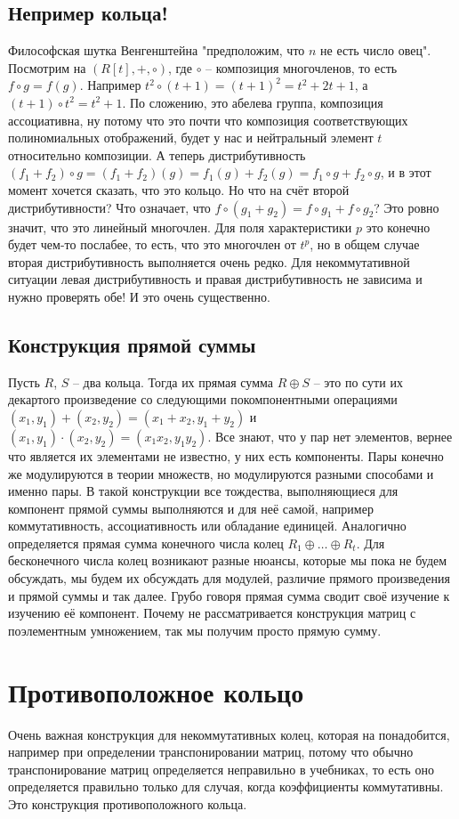 \subsection{Непример кольца!}
Философская шутка Венгенштейна "предположим, что $n$
не есть число овец". Посмотрим на $(R[t], +, \circ)$, где $\circ$ –
композиция многочленов, то есть $f\circ g = f(g)$. Например $t^2\circ
(t+1)=(t+1)^2=t^2+2t+1$, а $(t+1)\circ t^2=t^2+1$. По сложению, это
абелева группа, композиция ассоциативна, ну потому что это почти что
композиция соответствующих полиномиальных отображений, будет у нас и
нейтральный элемент $t$ относительно композиции. А теперь
дистрибутивность $(f_1+f_2)\circ g=(f_1+f_2)(g)=f_1(g)+f_2(g)=f_1\circ
g + f_2\circ g$, и в этот момент хочется сказать, что это кольцо. Но
что на счёт второй дистрибутивности? Что означает, что $f\circ(g_1+g_2)
=f\circ g_1 + f\circ g_2$? Это ровно значит, что это линейный многочлен.
Для поля характеристики $p$ это конечно будет чем-то послабее, то есть,
что это многочлен от $t^p$, но в общем случае вторая дистрибутивность
выполняется очень редко. Для некоммутативной ситуации левая
дистрибутивность и правая дистрибутивность не зависима и нужно
проверять обе! И это очень существенно.

\subsection{Конструкция прямой суммы}
Пусть $R$, $S$ – два кольца. Тогда их прямая сумма $R\oplus S$ – это по сути
их декартого произведение со следующими покомпонентными операциями $(x_1,y_1)+
(x_2,y_2)=(x_1+x_2,y_1+y_2)$ и $(x_1,y_1)\cdot(x_2,y_2)=(x_1x_2,y_1y_2)$. Все
знают, что у пар нет элементов, вернее что является их элементами не известно,
у них есть компоненты. Пары конечно же модулируются в теории множеств, но
модулируются разными способами и именно пары. В такой конструкции все тождества,
выполняющиеся для компонент прямой суммы выполняются и для неё самой, например
коммутативность, ассоциативность или обладание единицей. Аналогично определяется
прямая сумма конечного числа колец $R_1\oplus\ldots\oplus R_t$. Для бесконечного
числа колец возникают разные нюансы, которые мы пока не будем обсуждать, мы
будем их обсуждать для модулей, различие прямого произведения и прямой суммы и
так далее. Грубо говоря прямая сумма сводит своё изучение к изучению её
компонент. Почему не рассматривается конструкция матриц с поэлементным
умножением, так мы получим просто прямую сумму.

\section{Противоположное кольцо}
Очень важная конструкция для некоммутативных колец, которая на понадобится,
например при определении транспонировании матриц, потому что обычно
транспонирование матриц определяется неправильно в учебниках, то есть оно
определяется правильно только для случая, когда коэффициенты коммутативны. Это
конструкция противоположного кольца.

